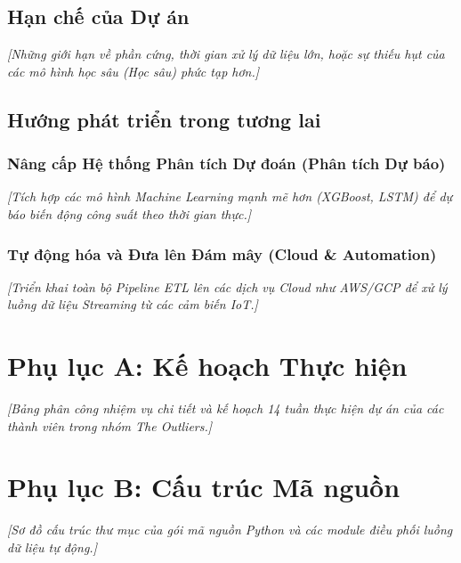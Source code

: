 \documentclass[12pt, a4paper]{report}
\begin{document}
\section{Hạn chế của Dự án}
\label{sec:limitations}
\textit{[Những giới hạn về phần cứng, thời gian xử lý dữ liệu lớn, hoặc sự thiếu hụt của các mô hình học sâu (Học sâu) phức tạp hơn.]}

\section{Hướng phát triển trong tương lai}
\label{sec:future_work}
\subsection{Nâng cấp Hệ thống Phân tích Dự đoán (Phân tích Dự báo)}
\textit{[Tích hợp các mô hình Machine Learning mạnh mẽ hơn (XGBoost, LSTM) để dự báo biến động công suất theo thời gian thực.]}

\subsection{Tự động hóa và Đưa lên Đám mây (Cloud \& Automation)}
\label{sec:future_work_cloud}
\textit{[Triển khai toàn bộ Pipeline ETL lên các dịch vụ Cloud như AWS/GCP để xử lý luồng dữ liệu Streaming từ các cảm biến IoT.]}

\newpage
\chapter*{Phụ lục A: Kế hoạch Thực hiện}
\label{app:kehoach}
\textit{[Bảng phân công nhiệm vụ chi tiết và kế hoạch 14 tuần thực hiện dự án của các thành viên trong nhóm The Outliers.]}


\chapter*{Phụ lục B: Cấu trúc Mã nguồn}
\label{app:code}
\textit{[Sơ đồ cấu trúc thư mục của gói mã nguồn Python và các module điều phối luồng dữ liệu tự động.]}
\end{document}
